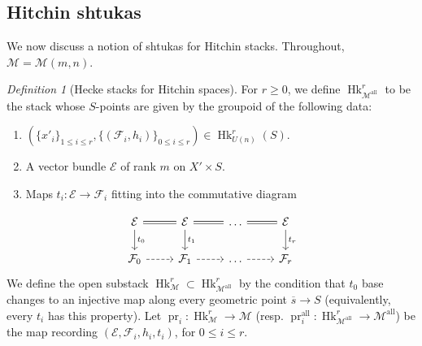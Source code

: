 \documentclass[reqno]{amsart}
\numberwithin{equation}{section}
\newcommand{\ol}[1]{\overline{#1}}
\newcommand{\Cal}[1]{\mathcal{#1}}
\newcommand{\co}{\colon}
\DeclareMathOperator{\pr}{pr}
\DeclareMathOperator{\Hk}{Hk}
\DeclareMathOperator{\all}{all}
\newcommand\cE{\mathcal{E}}
\newcommand\cF{\mathcal{F}}
\newcommand\cM{\mathcal{M}}
\theoremstyle{remark}
\newtheorem{defn}[thm]{Definition}
\numberwithin{equation}{section}
\begin{document}
\subsection{Hitchin shtukas}\label{ssec: Hitchin shtukas}
We now discuss a notion of shtukas for Hitchin stacks. Throughout, $\cM = \cM(m,n)$. 

\begin{defn}[Hecke stacks for Hitchin spaces]\label{defn: hitchin hecke}
For $r \geq 0$, we define $\Hk_{\Cal{M}^{\all}}^{r}$ to be the stack whose $S$-points are given by the groupoid of the following data: 	
\begin{enumerate}
\item $(\{x'_i\}_{1\le i\le r},\{(\cF_{i},h_{i})\}_{0\le i\le r})\in \Hk^{r}_{U(n)}(S)$. 
\item A vector bundle $\Cal{E}$ of rank $m$ on $X' \times S$. 
\item Maps $t_i \co \Cal{E} \rightarrow \Cal{F}_i$ fitting into the commutative diagram
\end{enumerate}
\[
\begin{tikzcd}
\Cal{E} \ar[r, equals] \ar[d, "t_0"] & \Cal{E} \ar[r, equals]  \ar[d, "t_1"] & \ldots \ar[r, equals] & \Cal{E} \ar[d, "t_r"]  \\
\Cal{F}_{0}  \ar[r, dashed] & \Cal{F}_1 \ar[r, dashed] & \ldots \ar[r, dashed] &  \Cal{F}_r
\end{tikzcd}
\]
We define the open substack $\Hk_{\Cal{M}}^{r} \subset \Hk_{\Cal{M}^{\all}}^{r}$ by the condition that $t_0 $ base changes to an injective map along every geometric point $\ol{s} \rightarrow S$ (equivalently, every $t_i$ has this property). Let $\pr_{i}: \Hk^{r}_{\cM}\to \cM$ (resp. $\pr_i^{\all} \co \Hk^r_{\cM^{\all}} \to \cM^{\all}$) be the map recording $(\cE, \cF_{i}, h_{i}, t_{i})$, for $0\le i\le r$.

\end{defn}
\end{document}
